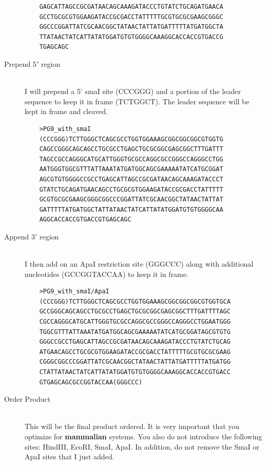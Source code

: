 \begin{description}
\begin{verbatim}
    GAGCATTAGCCGCGATAACAGCAAAGATACCCTGTATCTGCAGATGAACA
    GCCTGCGCGTGGAAGATACCGCGACCTATTTTTGCGTGCGCGAAGCGGGC
    GGCCCGGATTATCGCAACGGCTATAACTATTATGATTTTTATGATGGCTA
    TTATAACTATCATTATATGGATGTGTGGGGCAAAGGCACCACCGTGACCG
    TGAGCAGC
    \end{verbatim}
  \item[Prepend 5$'$ region] \hfill \\
  I will prepend a 5' smaI site (CCCGGG) and a portion of the leader sequence to keep it in frame (TCTGGCT). The leader sequence will be kept in frame and cleaved.
    \begin{verbatim}
    >PG9_with_smaI
    (CCCGGG)TCTTGGGCTCAGCGCCTGGTGGAAAGCGGCGGCGGCGTGGTG
    CAGCCGGGCAGCAGCCTGCGCCTGAGCTGCGCGGCGAGCGGCTTTGATTT
    TAGCCGCCAGGGCATGCATTGGGTGCGCCAGGCGCCGGGCCAGGGCCTGG
    AATGGGTGGCGTTTATTAAATATGATGGCAGCGAAAAATATCATGCGGAT
    AGCGTGTGGGGCCGCCTGAGCATTAGCCGCGATAACAGCAAAGATACCCT
    GTATCTGCAGATGAACAGCCTGCGCGTGGAAGATACCGCGACCTATTTTT
    GCGTGCGCGAAGCGGGCGGCCCGGATTATCGCAACGGCTATAACTATTAT
    GATTTTTATGATGGCTATTATAACTATCATTATATGGATGTGTGGGGCAA
    AGGCACCACCGTGACCGTGAGCAGC
    \end{verbatim}
   \item[Append 3$'$ region] \hfill \\
   I then add on an ApaI restriction site (GGGCCC) along with additional nucleotides (GCCGGTACCAA) to keep it in frame.
    \begin{verbatim}
    >PG9_with_smaI/ApaI
    (CCCGGG)TCTTGGGCTCAGCGCCTGGTGGAAAGCGGCGGCGGCGTGGTGCA
    GCCGGGCAGCAGCCTGCGCCTGAGCTGCGCGGCGAGCGGCTTTGATTTTAGC
    CGCCAGGGCATGCATTGGGTGCGCCAGGCGCCGGGCCAGGGCCTGGAATGGG
    TGGCGTTTATTAAATATGATGGCAGCGAAAAATATCATGCGGATAGCGTGTG
    GGGCCGCCTGAGCATTAGCCGCGATAACAGCAAAGATACCCTGTATCTGCAG
    ATGAACAGCCTGCGCGTGGAAGATACCGCGACCTATTTTTGCGTGCGCGAAG
    CGGGCGGCCCGGATTATCGCAACGGCTATAACTATTATGATTTTTATGATGG
    CTATTATAACTATCATTATATGGATGTGTGGGGCAAAGGCACCACCGTGACC
    GTGAGCAGCGCCGGTACCAA(GGGCCC)
    \end{verbatim}
   \item[Order Product] \hfill \\
   This will be the final product ordered. It is very important that you optimize for \textbf{mammalian} systems. You also do not introduce the following sites: HindIII, EcoRI, SmaI, ApaI. In addition, do not remove the SmaI or ApaI sites that I just added.
\end{description}

